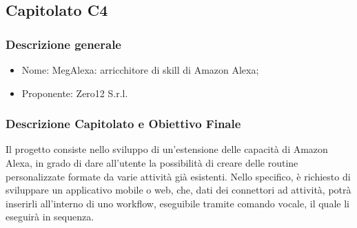 \subsection{Capitolato C4}

\subsubsection{Descrizione generale}
\begin{itemize}
	\item Nome: MegAlexa: arricchitore di skill di Amazon Alexa;
	\item Proponente: Zero12 S.r.l.
\end{itemize}

\subsubsection{Descrizione Capitolato e Obiettivo Finale}
Il progetto consiste nello sviluppo di un'estensione delle capacità di Amazon Alexa\glossario, in grado di dare all'utente la possibilità di creare delle routine personalizzate formate da varie attività già esistenti.
Nello specifico, è richiesto di sviluppare un applicativo mobile o web, che, dati dei connettori ad attività, potrà inserirli all'interno di uno workflow, eseguibile tramite comando vocale, il quale li eseguirà in sequenza.

